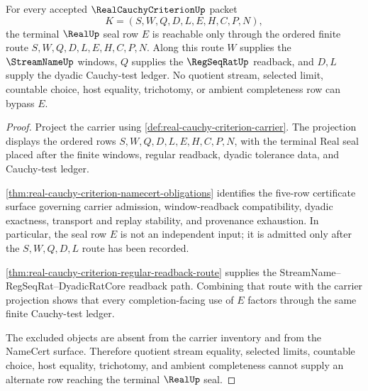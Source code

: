 \begin{theorem}
\label{thm:real-cauchy-criterion-seal-factorization}
For every accepted $\RealCauchyCriterionUp$ packet
$$
K=(S,W,Q,D,L,E,H,C,P,N),
$$
the terminal $\RealUp$ seal row $E$ is reachable only through the ordered finite route $S,W,Q,D,L,E,H,C,P,N$. Along this route $W$ supplies the $\StreamNameUp$ windows, $Q$ supplies the $\RegSeqRatUp$ readback, and $D,L$ supply the dyadic Cauchy-test ledger. No quotient stream, selected limit, countable choice, host equality, trichotomy, or ambient completeness row can bypass $E$.
\end{theorem}
\begin{proof}
Project the carrier using \autoref{def:real-cauchy-criterion-carrier}. The projection displays the ordered rows $S,W,Q,D,L,E,H,C,P,N$, with the terminal Real seal placed after the finite windows, regular readback, dyadic tolerance data, and Cauchy-test ledger.

\autoref{thm:real-cauchy-criterion-namecert-obligations} identifies the five-row certificate surface governing carrier admission, window-readback compatibility, dyadic exactness, transport and replay stability, and provenance exhaustion. In particular, the seal row $E$ is not an independent input; it is admitted only after the $S,W,Q,D,L$ route has been recorded.

\autoref{thm:real-cauchy-criterion-regular-readback-route} supplies the StreamName--RegSeqRat--DyadicRatCore readback path. Combining that route with the carrier projection shows that every completion-facing use of $E$ factors through the same finite Cauchy-test ledger.

The excluded objects are absent from the carrier inventory and from the NameCert surface. Therefore quotient stream equality, selected limits, countable choice, host equality, trichotomy, and ambient completeness cannot supply an alternate row reaching the terminal $\RealUp$ seal.
\end{proof}


